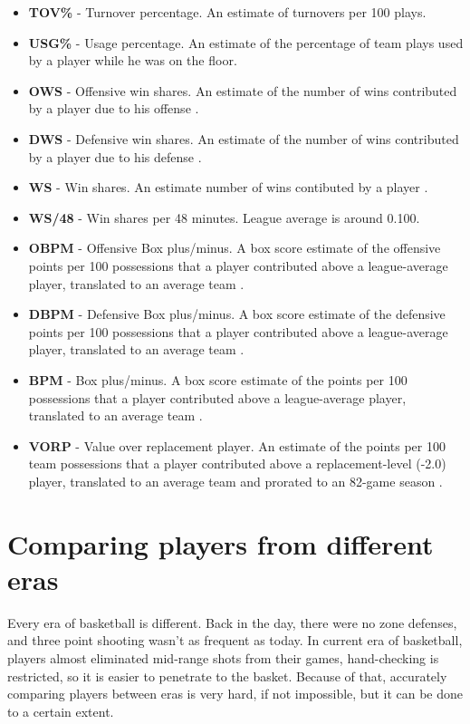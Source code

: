 \documentclass[a4paper]{article}
\begin{document}
\begin{itemize}
	\item \textbf{TOV\%} - Turnover percentage. An estimate of turnovers per 100 plays. 
	\item \textbf{USG\%} - Usage percentage. An estimate of the percentage of team plays used by a player while he was on the floor.  
	\item \textbf{OWS} - Offensive win shares. An estimate of the number of wins contributed by a player due to his offense \cite{ws}. 
	\item \textbf{DWS} - Defensive win shares. An estimate of the number of wins contributed by a player due to his defense \cite{ws}. 
	\item \textbf{WS} - Win shares. An estimate number of wins contibuted by a player \cite{ws}.
	\item \textbf{WS/48} - Win shares per 48 minutes. League average is around 0.100.
	\item \textbf{OBPM} - Offensive Box plus/minus. A box score estimate of the offensive points per 100 possessions that a player contributed above a league-average player, translated to an average team \cite{bpm}.
	\item \textbf{DBPM} - Defensive Box plus/minus. A box score estimate of the defensive points per 100 possessions that a player contributed above a league-average player, translated to an average team \cite{bpm}.
	\item \textbf{BPM} - Box plus/minus. A box score estimate of the points per 100 possessions that a player contributed above a league-average player, translated to an average team \cite{bpm}.
	\item \textbf{VORP} - Value over replacement player. An estimate of the points per 100 team possessions that a player contributed above a replacement-level (-2.0) player, translated to an average team and prorated to an 82-game season \cite{bpm}.

\end{itemize}

\section{Comparing players from different eras}
\label{sec:diff_eras}

Every era of basketball is different. Back in the day, there were no zone defenses, and three point shooting wasn't as frequent as today. In current era of basketball, players almost eliminated mid-range shots from their games, hand-checking is restricted, so it is easier to penetrate to the basket. Because of that, accurately comparing players between eras is very hard, if not impossible, but it can be done to a certain extent.
\end{document}

